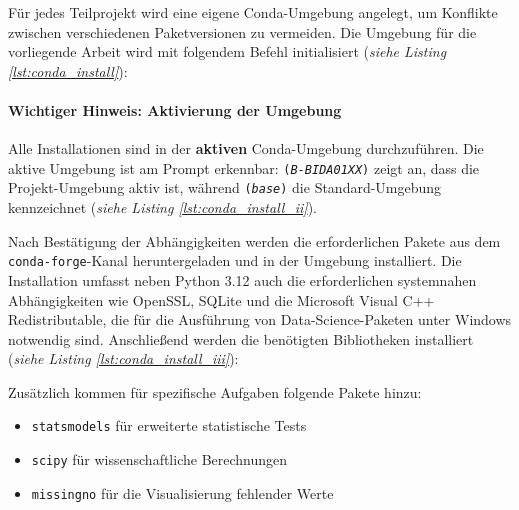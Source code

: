 Für jedes Teilprojekt wird eine eigene Conda-Umgebung angelegt, um Konflikte zwischen verschiedenen Paketversionen zu vermeiden. Die Umgebung für die vorliegende Arbeit wird mit folgendem Befehl initialisiert (\textit{siehe Listing \ref{lst:conda_install}}):



\paragraph{\textbf{Wichtiger Hinweis: Aktivierung der Umgebung}}

Alle Installationen sind in der \textbf{aktiven} Conda-Umgebung durchzuführen. Die aktive Umgebung ist am Prompt erkennbar: \texttt{(\textit{B-BIDA01XX})} zeigt an, dass die Projekt-Umgebung aktiv ist, während \texttt{(\textit{base})} die Standard-Umgebung kennzeichnet (\textit{siehe Listing \ref{lst:conda_install_ii}}).



Nach Bestätigung der Abhängigkeiten werden die erforderlichen Pakete aus dem \texttt{conda-forge}-Kanal heruntergeladen und in der Umgebung installiert. Die Installation umfasst neben Python 3.12 auch die erforderlichen systemnahen Abhängigkeiten wie \acs{OpenSSL}, \acs{SQLite} und die Microsoft Visual C++ Redistributable, die für die Ausführung von Data-Science-Paketen unter Windows notwendig sind. Anschließend werden die benötigten Bibliotheken installiert (\textit{siehe Listing \ref{lst:conda_install_iii}}):



Zusätzlich kommen für spezifische Aufgaben folgende Pakete hinzu:

\begin{itemize}
    \item \texttt{statsmodels} für erweiterte statistische Tests
    \item \texttt{scipy} für wissenschaftliche Berechnungen
    \item \texttt{missingno} für die Visualisierung fehlender Werte
\end{itemize}

